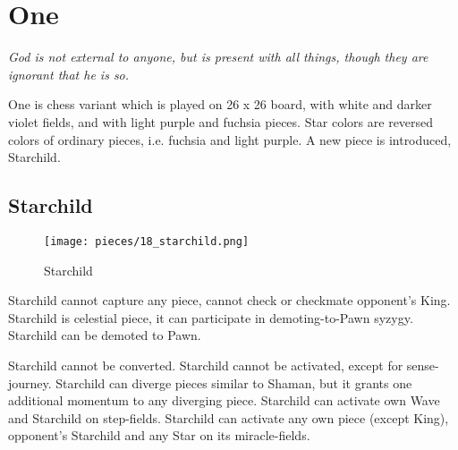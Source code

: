 

\chapter*{One}
\label{ch:One}

\begin{flushright}
\parbox{0.8\textwidth}{
\emph{God is not external to anyone, but is present with all things, though
they are ignorant that he is so. \newline
{} } }
\end{flushright}

\noindent
One is chess variant which is played on 26 x 26 board, with white and
darker violet fields, and with light purple and fuchsia pieces. Star
colors are reversed colors of ordinary pieces, i.e. fuchsia and light
purple. A new piece is introduced, Starchild.

\clearpage %

\section*{Starchild}
\label{sec:One/Starchild}

\vspace*{-0.8\baselineskip}
\noindent
\begin{wrapfigure}[11]{l}{0.4\textwidth}
\centering
\texttt{[image: pieces/18\_starchild.png]}
\caption{Starchild}
\label{fig:18_starchild}
\end{wrapfigure}
Starchild cannot capture any piece, cannot check or checkmate opponent's King.
Starchild is celestial piece, it can participate in demoting-to-Pawn syzygy.
Starchild can be demoted to Pawn.

Starchild cannot be converted. Starchild cannot be activated, except for
sense-journey. Starchild can diverge pieces similar to Shaman, but it grants
one additional momentum to any diverging piece. Starchild can activate own
Wave and Starchild on step-fields. Starchild can activate any own piece
(except King), opponent's Starchild and any Star on its miracle-fields.

